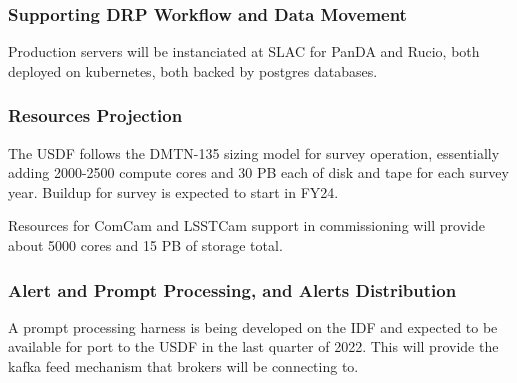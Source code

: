 \subsubsection{Supporting DRP Workflow and Data Movement}

Production servers will be instanciated at SLAC for PanDA and Rucio,
both deployed on kubernetes, both backed by postgres databases.

\subsubsection{Resources Projection}

The USDF follows the DMTN-135 sizing model for survey operation,
essentially adding 2000-2500 compute cores and 30 PB each of disk and
tape for each survey year. Buildup for survey is expected to start in FY24.

Resources for ComCam and LSSTCam support in commissioning will provide
about 5000 cores and 15 PB of storage total.

\subsubsection{Alert and Prompt Processing, and Alerts Distribution}

A prompt processing harness is being developed on the IDF and expected to be
available for port to the USDF in the last quarter of 2022. This will
provide the kafka feed mechanism that brokers will be connecting to.